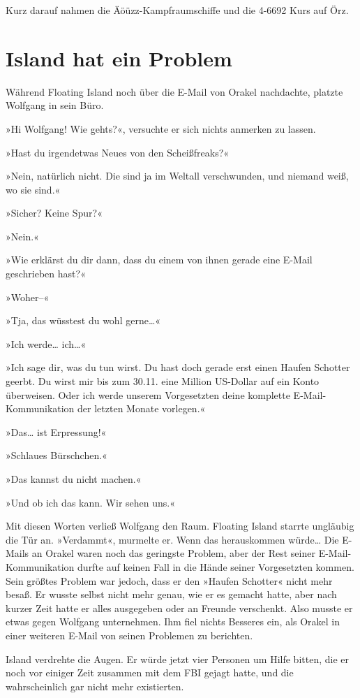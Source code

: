 Kurz darauf nahmen die Äöüzz-Kampfraumschiffe und die 4-6692 Kurs auf Örz.


\chapter{Island hat ein Problem}

Während Floating Island noch über die E-Mail von Orakel nachdachte, platzte Wolfgang in sein Büro.

»Hi Wolfgang! Wie gehts?«, versuchte er sich nichts anmerken zu lassen.

»Hast du irgendetwas Neues von den Scheißfreaks?«

»Nein, natürlich nicht. Die sind ja im Weltall verschwunden, und niemand weiß, wo sie sind.«

»Sicher? Keine Spur?«

»Nein.«

»Wie erklärst du dir dann, dass du einem von ihnen gerade eine E-Mail geschrieben hast?«

»Woher–«

»Tja, das wüsstest du wohl gerne…«

»Ich werde… ich…«

»Ich sage dir, was du tun wirst. Du hast doch gerade erst einen Haufen Schotter geerbt. Du wirst mir bis zum 30.11. eine Million US-Dollar auf ein Konto überweisen. Oder ich werde unserem Vorgesetzten deine komplette E-Mail-Kommunikation der letzten Monate vorlegen.«

»Das… ist Erpressung!«

»Schlaues Bürschchen.«

»Das kannst du nicht machen.«

»Und ob ich das kann. Wir sehen uns.«

Mit diesen Worten verließ Wolfgang den Raum. Floating Island starrte ungläubig die Tür an. »Verdammt«, murmelte er. Wenn das herauskommen würde… Die E-Mails an Orakel waren noch das geringste Problem, aber der Rest seiner E-Mail-Kommunikation durfte auf keinen Fall in die Hände seiner Vorgesetzten kommen. Sein größtes Problem war jedoch, dass er den »Haufen Schotter« nicht mehr besaß. Er wusste selbst nicht mehr genau, wie er es gemacht hatte, aber nach kurzer Zeit hatte er alles ausgegeben oder an Freunde verschenkt. Also musste er etwas gegen Wolfgang unternehmen. Ihm fiel nichts Besseres ein, als Orakel in einer weiteren E-Mail von seinen Problemen zu berichten.

Island verdrehte die Augen. Er würde jetzt vier Personen um Hilfe bitten, die er noch vor einiger Zeit zusammen mit dem FBI gejagt hatte, und die wahrscheinlich gar nicht mehr existierten.

